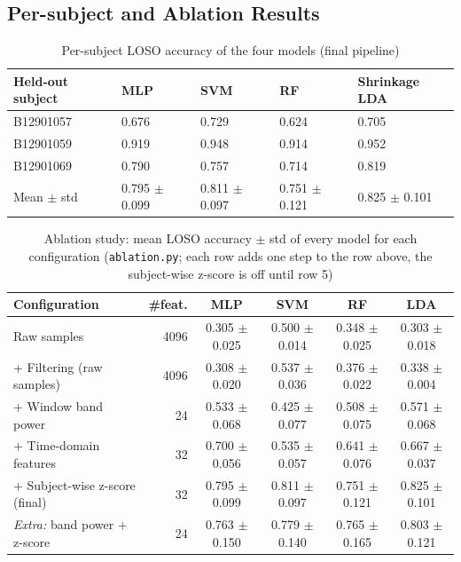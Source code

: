 \subsection{Per-subject and Ablation Results}
\begin{table}[H]
    \centering
    \caption{Per-subject LOSO accuracy of the four models (final pipeline)}
    \label{tab:per_subject}
    \begin{tabularx}{\textwidth}{@{} l X X X X @{}}
        \toprule
        \textbf{Held-out subject} & \textbf{MLP} & \textbf{SVM} & \textbf{RF} & \textbf{Shrinkage LDA} \\
        \midrule
        B12901057 & 0.676 & 0.729 & 0.624 & 0.705 \\
        B12901059 & 0.919 & 0.948 & 0.914 & 0.952 \\
        B12901069 & 0.790 & 0.757 & 0.714 & 0.819 \\
        \midrule
        Mean $\pm$ std & 0.795 $\pm$ 0.099 & 0.811 $\pm$ 0.097 & 0.751 $\pm$ 0.121 & 0.825 $\pm$ 0.101 \\
        \bottomrule
    \end{tabularx}
\end{table}

\begin{table}[!htb]
    \centering
    \caption{Ablation study: mean LOSO accuracy $\pm$ std of every model for each configuration (\texttt{ablation.py}; each row adds one step to the row above, the subject-wise z-score is off until row 5)}
    \label{tab:ablation_full}
    \small
    \setlength{\tabcolsep}{3.5pt}
    \begin{tabular}{@{} l r c c c c @{}}
        \toprule
        \textbf{Configuration} & \textbf{\#feat.} & \textbf{MLP} & \textbf{SVM} & \textbf{RF} & \textbf{LDA} \\
        \midrule
        Raw samples & 4096 & 0.305 $\pm$ 0.025 & 0.500 $\pm$ 0.014 & 0.348 $\pm$ 0.025 & 0.303 $\pm$ 0.018 \\
        + Filtering (raw samples) & 4096 & 0.308 $\pm$ 0.020 & 0.537 $\pm$ 0.036 & 0.376 $\pm$ 0.022 & 0.338 $\pm$ 0.004 \\
        + Window band power & 24 & 0.533 $\pm$ 0.068 & 0.425 $\pm$ 0.077 & 0.508 $\pm$ 0.075 & 0.571 $\pm$ 0.068 \\
        + Time-domain features & 32 & 0.700 $\pm$ 0.056 & 0.535 $\pm$ 0.057 & 0.641 $\pm$ 0.076 & 0.667 $\pm$ 0.037 \\
        + Subject-wise z-score (final) & 32 & 0.795 $\pm$ 0.099 & 0.811 $\pm$ 0.097 & 0.751 $\pm$ 0.121 & 0.825 $\pm$ 0.101 \\
        \midrule
        \emph{Extra:} band power + z-score & 24 & 0.763 $\pm$ 0.150 & 0.779 $\pm$ 0.140 & 0.765 $\pm$ 0.165 & 0.803 $\pm$ 0.121 \\
        \bottomrule
    \end{tabular}
\end{table}

